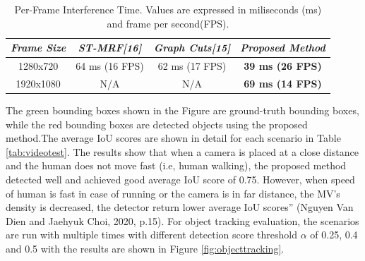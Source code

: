 \begin{table}[]
\centering
\caption{Per-Frame Interference Time. Values are expressed in miliseconds (ms) and frame per second(FPS).}
\label{tab:timemessasure}
\begin{tabular}{|c|c|c|c|}
\hline
\textit{Frame Size} & \textit{ST-MRF{[}16{]}} & \textit{Graph Cuts{[}15{]}} & \textit{Proposed Method} \\ \hline
1280x720            & 64 ms (16 FPS)         & 62 ms (17 FPS)              & \textbf{39 ms (26 FPS)}  \\ \hline
1920x1080           & N/A                    & N/A                        & \textbf{69 ms (14 FPS)}  \\ \hline
\end{tabular}
\end{table}
The green bounding boxes shown in the Figure are ground-truth bounding boxes, while the red bounding boxes are detected objects using the proposed method.The average IoU scores are shown in detail for each scenario in Table \ref{tab:videotest}. The results show that when a camera is placed at a close distance and the human does not move fast (i.e, human walking), the proposed method detected well and achieved good average IoU score of 0.75. However, when speed of human is fast in case of running or the camera is in far distance, the MV's density is decreased, the detector return lower average IoU scores” (Nguyen Van Dien and Jaehyuk Choi, 2020, p.15). For object tracking evaluation, the scenarios are run with multiple times with different detection score threshold $\alpha$ of 0.25, 0.4 and 0.5 with the results are shown in Figure  \ref{fig:objecttracking}. 
